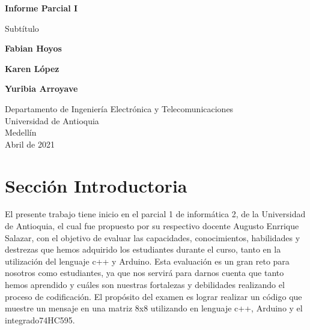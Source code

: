 \documentclass{article}
\begin{document}
\begin{titlepage}
    \begin{center}
        \vspace*{1cm}
            
        \Huge
        \textbf{Informe Parcial I}
            
        \vspace{0.5cm}
        \LARGE
        Subtítulo
            
        \vspace{1.5cm}
            
        \textbf{Fabian Hoyos}
        
        \vspace{1.5cm}
        
        \textbf{Karen López}
        
        \vspace{1.5cm}
        
        \textbf{Yuribia Arroyave}
            
        \vfill
            
        \vspace{0.8cm}
            
        \Large
        Departamento de Ingeniería Electrónica y Telecomunicaciones\\
        Universidad de Antioquia\\
        Medellín\\
       Abril de 2021
            
    \end{center}
\end{titlepage}

\tableofcontents
\newpage
\section{Sección Introductoria}\label{intro}

El presente trabajo tiene inicio en el parcial 1 de informática 2, de la Universidad de Antioquia, el cual fue propuesto por su respectivo docente Augusto Enrrique Salazar, con el objetivo de evaluar las capacidades, conocimientos, habilidades y destrezas que hemos adquirido los estudiantes durante el curso, tanto en la utilización del lenguaje c++ y Arduino.
Esta evaluación es un gran reto para nosotros como estudiantes, ya que nos servirá para darnos cuenta que tanto hemos aprendido y cuáles son nuestras fortalezas y debilidades realizando el proceso de codificación.
El propósito del examen es lograr realizar un código que muestre un mensaje en una matriz 8x8 utilizando en lenguaje c++, Arduino y el integrado74HC595.
\end{document}
